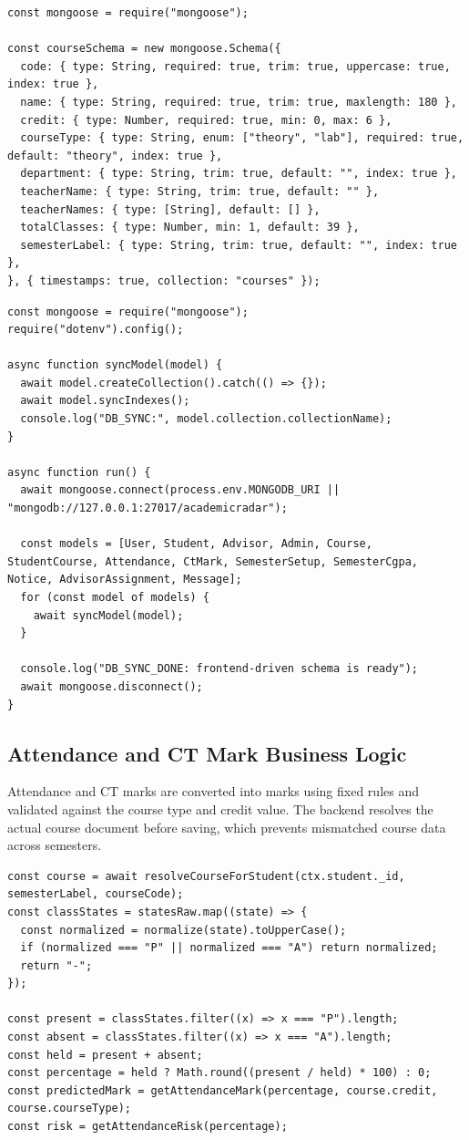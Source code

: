 \documentclass[12pt,a4paper]{article}
\begin{document}
\begin{lstlisting}
const mongoose = require("mongoose");

const courseSchema = new mongoose.Schema({
  code: { type: String, required: true, trim: true, uppercase: true, index: true },
  name: { type: String, required: true, trim: true, maxlength: 180 },
  credit: { type: Number, required: true, min: 0, max: 6 },
  courseType: { type: String, enum: ["theory", "lab"], required: true, default: "theory", index: true },
  department: { type: String, trim: true, default: "", index: true },
  teacherName: { type: String, trim: true, default: "" },
  teacherNames: { type: [String], default: [] },
  totalClasses: { type: Number, min: 1, default: 39 },
  semesterLabel: { type: String, trim: true, default: "", index: true },
}, { timestamps: true, collection: "courses" });
\end{lstlisting}

\begin{lstlisting}
const mongoose = require("mongoose");
require("dotenv").config();

async function syncModel(model) {
  await model.createCollection().catch(() => {});
  await model.syncIndexes();
  console.log("DB_SYNC:", model.collection.collectionName);
}

async function run() {
  await mongoose.connect(process.env.MONGODB_URI || "mongodb://127.0.0.1:27017/academicradar");

  const models = [User, Student, Advisor, Admin, Course, StudentCourse, Attendance, CtMark, SemesterSetup, SemesterCgpa, Notice, AdvisorAssignment, Message];
  for (const model of models) {
    await syncModel(model);
  }

  console.log("DB_SYNC_DONE: frontend-driven schema is ready");
  await mongoose.disconnect();
}
\end{lstlisting}

\subsection{Attendance and CT Mark Business Logic}
Attendance and CT marks are converted into marks using fixed rules and validated against the course type and credit value. The backend resolves the actual course document before saving, which prevents mismatched course data across semesters.

\begin{lstlisting}
const course = await resolveCourseForStudent(ctx.student._id, semesterLabel, courseCode);
const classStates = statesRaw.map((state) => {
  const normalized = normalize(state).toUpperCase();
  if (normalized === "P" || normalized === "A") return normalized;
  return "-";
});

const present = classStates.filter((x) => x === "P").length;
const absent = classStates.filter((x) => x === "A").length;
const held = present + absent;
const percentage = held ? Math.round((present / held) * 100) : 0;
const predictedMark = getAttendanceMark(percentage, course.credit, course.courseType);
const risk = getAttendanceRisk(percentage);
\end{lstlisting}
\end{document}
